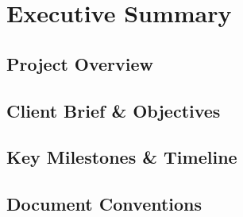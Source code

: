 \section{Executive Summary}

\subsection{Project Overview}

\subsection{Client Brief \& Objectives}

\subsection{Key Milestones \& Timeline}

\subsection{Document Conventions}
